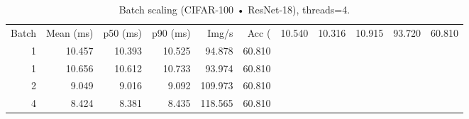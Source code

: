 \begin{table}
\caption{Batch scaling (CIFAR-100 • ResNet-18), threads=4.}
\label{tab:batch_cifar100_resnet18}
\begin{tabular}{rrrrrr}
\toprule
Batch & Mean (ms) & p50 (ms) & p90 (ms) & Img/s & Acc (%
 & 10.540 & 10.316 & 10.915 & 93.720 & 60.810 \\
1 & 10.457 & 10.393 & 10.525 & 94.878 & 60.810 \\
1 & 10.656 & 10.612 & 10.733 & 93.974 & 60.810 \\
2 & 9.049 & 9.016 & 9.092 & 109.973 & 60.810 \\
4 & 8.424 & 8.381 & 8.435 & 118.565 & 60.810 \\
\bottomrule
\end{tabular}
\end{table}
